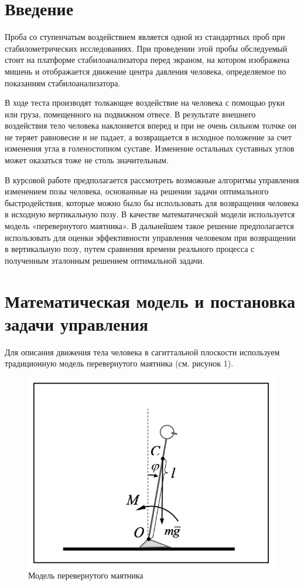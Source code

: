 \documentclass[a4paper,14pt]{article}
\theoremstyle{plain} %
\theoremstyle{definition} %
\theoremstyle{remark} %
\begin{document}
\thispagestyle{empty} %
\normalsize{
\newpage
\tableofcontents
\newpage

\section{Введение}
Проба со ступенчатым воздействием является одной из стандартных проб
при стабилометрических исследованиях. При проведении этой пробы
обследуемый стоит на платформе стабилоанализатора перед экраном, на
котором изображена мишень и отображается движение центра давления
человека, определяемое по показаниям стабилоанализатора.

В ходе теста производят толкающее воздействие на человека с помощью руки или
груза, помещенного на подвижном отвесе. В результате внешнего
воздействия тело человека наклоняется вперед и при не очень сильном толчке
он не теряет равновесие и не падает, а возвращается в исходное
положение за счет изменения угла в голеностопном суставе. Изменение
остальных суставных углов может оказаться тоже не столь значительным.

В курсовой работе предполагается рассмотреть возможные
алгоритмы управления изменением позы человека, основанные на решении задачи
оптимального быстродействия, которые можно было бы использовать для
возвращения человека в исходную вертикальную позу. В качестве математической модели
используется модель «перевернутого маятника». В дальнейшем
такое решение предполагается использовать для оценки эффективности управления человеком
при возвращении в вертикальную позу, путем сравнения
времени реального процесса с полученным эталонным решением оптимальной задачи.
\newpage
\section{Математическая модель и постановка задачи управления}
Для описания движения тела человека в сагиттальной плоскости используем традиционную модель перевернутого маятника (см. рисунок 1).

\begin{figure}[h!]
    \centering
    \includegraphics[width=1.00\linewidth]{pendulum.png}
    \caption{Модель перевернутого маятника}
    \label{fig:pendulum}
\end{figure}

}
\end{document}
